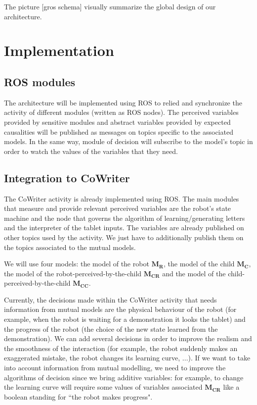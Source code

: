 \documentclass[10pt,a4paper,twocolumn]{article}
\begin{document}
The picture [gros schema] visually summarize the global design of our architecture. 

\section{Implementation}

\subsection{ROS modules}

The architecture will be implemented using ROS to relied and synchronize the activity of different modules (written as ROS nodes). The perceived variables provided by sensitive modules and abstract variables provided by expected causalities will be published as messages on topics specific to the associated models. In the same way, module of decision will subscribe to the model's topic in order to watch the values of the variables that they need. 

\subsection{Integration to CoWriter}

The CoWriter activity is already implemented using ROS. The main modules that measure and provide relevant perceived variables are the robot's state machine and the node that governs the algorithm of learning/generating letters and the interpreter of the tablet inputs. The variables are already published on other topics used by the activity. We just have to additionally publish them on the topics associated to the mutual models. 

We will use four models: the model of the robot $\textbf{M}_\textbf{R}$, the model of the child $\textbf{M}_\textbf{C}$, the model of the robot-perceived-by-the-child $\textbf{M}_\textbf{CR}$ and the model of the child-perceived-by-the-child $\textbf{M}_\textbf{CC}$.

Currently, the decisions made within the CoWriter activity that needs information from mutual models are the physical behaviour of the robot (for example, when the robot is waiting for a demonstration it looks the tablet) and the progress of the robot (the choice of the new state learned from the demonstration). We can add several decisions in order to improve the realism and the smoothness of the interaction (for example, the robot suddenly makes an exaggerated mistake, the robot changes its learning curve, ...). If we want to take into account information from mutual modelling, we need to improve the algorithms of decision since we bring additive variables: for example, to change the learning curve will require some values of variables associated $\textbf{M}_\textbf{CR}$ like a boolean standing for ``the robot makes progress".
\end{document}
